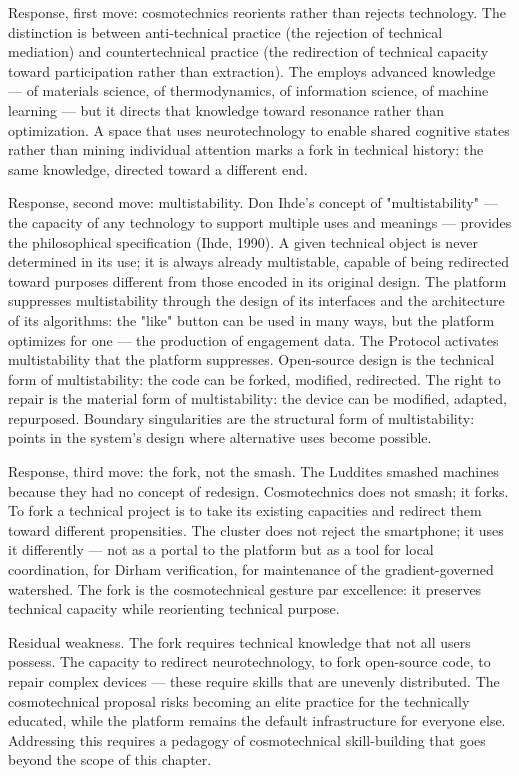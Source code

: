 Response, first move: cosmotechnics reorients rather than rejects technology. The distinction is between anti-technical practice (the rejection of technical mediation) and countertechnical practice (the redirection of technical capacity toward participation rather than extraction). The  employs advanced knowledge — of materials science, of thermodynamics, of information science, of machine learning — but it directs that knowledge toward resonance rather than optimization. A space that uses neurotechnology to enable shared cognitive states rather than mining individual attention marks a fork in technical history: the same knowledge, directed toward a different end.

Response, second move: multistability. Don Ihde's concept of "multistability" — the capacity of any technology to support multiple uses and meanings — provides the philosophical specification (Ihde, 1990). A given technical object is never determined in its use; it is always already multistable, capable of being redirected toward purposes different from those encoded in its original design. The platform suppresses multistability through the design of its interfaces and the architecture of its algorithms: the "like" button can be used in many ways, but the platform optimizes for one — the production of engagement data. The  Protocol activates multistability that the platform suppresses. Open-source design is the technical form of multistability: the code can be forked, modified, redirected. The right to repair is the material form of multistability: the device can be modified, adapted, repurposed. Boundary singularities are the structural form of multistability: points in the system's design where alternative uses become possible.

Response, third move: the fork, not the smash. The Luddites smashed machines because they had no concept of redesign. Cosmotechnics does not smash; it forks. To fork a technical project is to take its existing capacities and redirect them toward different propensities. The  cluster does not reject the smartphone; it uses it differently — not as a portal to the platform but as a tool for local coordination, for Dirham verification, for maintenance of the gradient-governed watershed. The fork is the cosmotechnical gesture par excellence: it preserves technical capacity while reorienting technical purpose.

Residual weakness. The fork requires technical knowledge that not all users possess. The capacity to redirect neurotechnology, to fork open-source code, to repair complex devices — these require skills that are unevenly distributed. The cosmotechnical proposal risks becoming an elite practice for the technically educated, while the platform remains the default infrastructure for everyone else. Addressing this requires a pedagogy of cosmotechnical skill-building that goes beyond the scope of this chapter.

